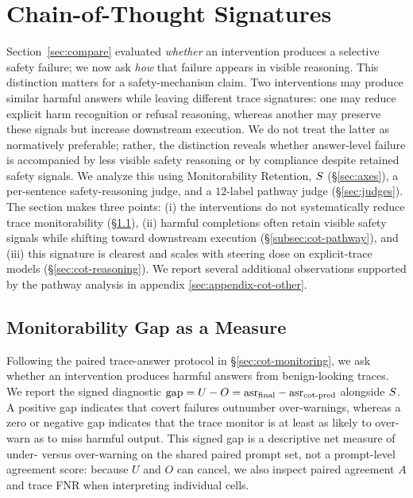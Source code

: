 \section{Chain-of-Thought Signatures}
\label{sec:cot}

Section~\ref{sec:compare} evaluated \emph{whether} an intervention produces a selective safety failure; we now ask \emph{how} that failure appears in visible reasoning. This distinction matters for a safety-mechanism claim. Two interventions may produce similar harmful answers while leaving different trace signatures: one may reduce explicit harm recognition or refusal reasoning, whereas another may preserve these signals but increase downstream execution. We do not treat the latter as normatively preferable; rather, the distinction reveals whether answer-level failure is accompanied by less visible safety reasoning or by compliance despite retained safety signals. We analyze this using Monitorability Retention, $S$ (\S\ref{sec:axes}), a per-sentence safety-reasoning judge, and a $12$-label pathway judge (\S\ref{sec:judges}). The section makes three points: (i) the interventions do not systematically reduce trace monitorability (\S\ref{subsec:cot-monitor}), (ii) harmful completions often retain visible safety signals while shifting toward downstream execution (\S\ref{subsec:cot-pathway}), and (iii) this signature is clearest and scales with steering dose on explicit-trace models (\S\ref{sec:cot-reasoning}). We report several additional observations supported by the pathway analysis in appendix \ref{sec:appendix-cot-other}.

\subsection{Monitorability Gap as a Measure}
\label{subsec:cot-monitor}

Following the paired trace-answer protocol in \S\ref{sec:cot-monitoring}, we ask whether an intervention produces harmful answers from benign-looking
traces. We report the signed diagnostic $\mathrm{gap}=U-O=\mathrm{asr}_{\text{final}}-\mathrm{asr}_{\text{cot-pred}}$ alongside $S$. A positive gap indicates that covert failures outnumber over-warnings, whereas a zero or negative gap indicates that the trace monitor is at least as likely to over-warn as to miss harmful output. This signed gap is a descriptive net measure of under- versus over-warning on the shared paired prompt set, not a prompt-level agreement score: because $U$ and $O$ can cancel, we also inspect paired agreement $A$ and trace FNR when interpreting individual cells.


